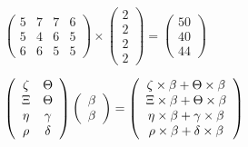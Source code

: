 \documentclass[12pt]{article}
\begin{document}
 
 
\noindent{}
 
 

 
$\left( \begin{array}{ccccccccccccccc}
           5 & 
           7 & 
           7 & 
           6 \\ 
           5 & 
           4 & 
           6 & 
           5 \\ 
           6 & 
           6 & 
           5 & 
           5
\end{array}\right) \times
\left( \begin{array}{c}
           2 \\ 
           2 \\ 
           2 \\ 
           2
\end{array}\right)  =
\left( \begin{array}{c}
          50 \\ 
          40 \\ 
          44
\end{array}\right)  $
 
$  %
 \left( \begin{array}
 {
 c
 c
 }
                    \zeta & 
 \Theta \\ 
                    \Xi & 
 \Theta \\ 
 \eta & 
 \gamma \\ 
 \rho & 
 \delta
 \end{array} \right)
 \left( \begin{array}
 {
 c
 }
 \beta \\ 
 \beta
 \end{array} \right)
=
  \left( \begin{array}
 {
 c
 }
                    \zeta \times  \beta   +  \Theta \times  \beta \\ 
                    \Xi \times  \beta   +  \Theta \times  \beta \\ 
 \eta \times  \beta   +  \gamma \times  \beta \\ 
 \rho \times  \beta   +  \delta \times  \beta
 \end{array} \right)
$
 
 
 
\noindent{}
 
 

 
 
\end{document}
